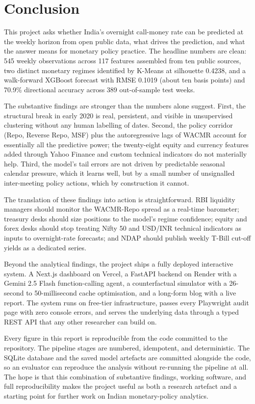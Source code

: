 \section{Conclusion}
\label{sec:conclusion}

This project asks whether India's overnight call-money rate can be
predicted at the weekly horizon from open public data, what drives
the prediction, and what the answer means for monetary policy
practice. The headline numbers are clean: 545 weekly observations
across 117 features assembled from ten public sources, two distinct
monetary regimes identified by K-Means at silhouette 0.4238, and a
walk-forward XGBoost forecast with RMSE 0.1019 (about ten basis
points) and 70.9\% directional accuracy across 389 out-of-sample test
weeks.

The substantive findings are stronger than the numbers alone suggest.
First, the structural break in early 2020 is real, persistent, and
visible in unsupervised clustering without any human labelling of
dates. Second, the policy corridor (Repo, Reverse Repo, MSF) plus the
autoregressive lags of WACMR account for essentially all the
predictive power; the twenty-eight equity and currency features added
through Yahoo Finance and custom technical indicators do not
materially help. Third, the model's tail errors are not driven by
predictable seasonal calendar pressure, which it learns well, but by
a small number of unsignalled inter-meeting policy actions, which by
construction it cannot.

The translation of these findings into action is straightforward. RBI
liquidity managers should monitor the WACMR-Repo spread as a
real-time barometer; treasury desks should size positions to the
model's regime confidence; equity and forex desks should stop
treating Nifty 50 and USD/INR technical indicators as inputs to
overnight-rate forecasts; and NDAP should publish weekly T-Bill
cut-off yields as a dedicated series.

Beyond the analytical findings, the project ships a fully deployed
interactive system. A Next.js dashboard on Vercel, a FastAPI backend
on Render with a Gemini 2.5 Flash function-calling agent, a
counterfactual simulator with a 26-second to 50-millisecond cache
optimisation, and a long-form blog with a live report. The system
runs on free-tier infrastructure, passes every Playwright audit page
with zero console errors, and serves the underlying data through a
typed REST API that any other researcher can build on.

Every figure in this report is reproducible from the code committed
to the repository. The pipeline stages are numbered, idempotent, and
deterministic. The SQLite database and the saved model artefacts are
committed alongside the code, so an evaluator can reproduce the
analysis without re-running the pipeline at all. The hope is that
this combination of substantive findings, working software, and full
reproducibility makes the project useful as both a research artefact
and a starting point for further work on Indian monetary-policy
analytics.
